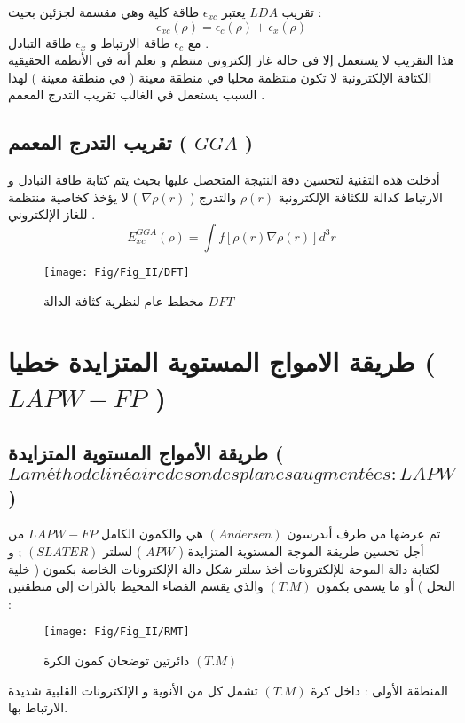 تقريب $ LDA $   يعتبر $ \epsilon_{xc} $ طاقة كلية وهي مقسمة لجزئين بحيث : 
\begin{equation}\label{key}
	\epsilon_{xc} (\rho) = \epsilon_{c} (\rho) + \epsilon_{x} (\rho)
\end{equation}
مع $  \epsilon_{c} $ طاقة الارتباط و $ \epsilon_{x} $ طاقة التبادل .\\
هذا التقريب لا يستعمل إلا في حالة غاز إلكتروني منتظم و نعلم أنه في الأنظمة الحقيقية الكثافة الإلكترونية لا تكون منتظمة محليا في منطقة معينة ( في منطقة معينة ) لهذا السبب يستعمل في الغالب تقريب التدرج المعمم .

\subsection{ تقريب التدرج المعمم ( $ GGA $ ) }

أدخلت هذه التقنية لتحسين دقة النتيجة المتحصل عليها بحيث يتم كتابة طاقة التبادل و الارتباط كدالة للكثافة الإلكترونية $ \rho(r) $ والتدرج ( $ \nabla \rho(r) $ )  لا يؤخذ كخاصية منتظمة للغاز الإلكتروني .
\begin{equation}\label{}
	E_{xc}^{GGA} (\rho) =  \int f \left[\rho (r) \nabla \rho(r) \right] d^{3}r
\end{equation}

\begin{figure}[bh]
	\centering
	\texttt{[image: Fig/Fig\_II/DFT]}
	\caption{ مخطط عام لنظرية كثافة الدالة $ DFT $ }
	\label{fig:dft-11}
\end{figure}


\section{ طريقة الامواج المستوية المتزايدة خطيا ( $ LAPW-FP $ ) }

\subsection{ طريقة الأمواج المستوية المتزايدة  ( $ La méthode linéaire des ondes planes augmentées : LAPW $ )}
تم عرضها من طرف أندرسون $ ( Andersen ) $ هي والكمون الكامل  $ LAPW-FP $ من أجل تحسين طريقة الموجة المستوية المتزايدة (  $ APW $ ) لسلتر $ ( SLATER )  $ ; و لكتابة دالة الموجة للإلكترونات أخذ سلتر شكل دالة الإلكترونات الخاصة بكمون ( خلية النحل ) أو ما يسمى بكمون $ ( T.M ) $ والذي يقسم الفضاء المحيط بالذرات إلى منطقتين :

\begin{figure}[h!]
	\centering
	\texttt{[image: Fig/Fig\_II/RMT]}
	\caption{دائرتين توضحان كمون الكرة $ (T.M) $ }
	\label{fig:lapw1}
\end{figure}
\FloatBarrier
المنطقة الأولى : داخل كرة $ (T.M) $ تشمل كل من الأنوية و الإلكترونات القلبية شديدة الارتباط بها.


